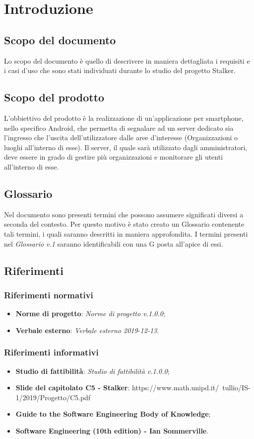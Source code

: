 \section{Introduzione}
\subsection{Scopo del documento}
Lo scopo del documento è quello di descrivere in maniera dettagliata i requisiti e i casi d'uso che sono stati individuati durante lo studio del progetto Stalker.
\subsection{Scopo del prodotto}
L'obbiettivo del prodotto è la realizzazione di un'applicazione per smartphone, nello specifico Android, che permetta di segnalare ad un server dedicato sia l'ingresso che l'uscita dell'utilizzatore dalle aree d'interesse (Organizzazioni o luoghi all'interno di esse).
Il server, il quale sarà utilizzato dagli amministratori, deve essere in grado di gestire più organizzazioni e monitorare gli utenti all'interno di esse.
\subsection{Glossario}
Nel documento sono presenti termini che possono assumere significati diversi a seconda del contesto. Per questo motivo è stato creato un Glossario contenente tali termini, i quali saranno descritti in maniera approfondita. I termini presenti nel \textit{Glossario v.1} saranno identificabili con una G posta all'apice di essi.

\subsection{Riferimenti}


\subsubsection{Riferimenti normativi}
\begin{itemize}
\item \textbf{Norme di progetto}: \textit{Norme di progetto v.1.0.0};
\item \textbf{Verbale esterno}: \textit{Verbale esterno 2019-12-13}.
\end{itemize}

\subsubsection{Riferimenti informativi}
\begin{itemize}
\item \textbf{Studio di fattibilità}: \textit{Studio di fattibilità v.1.0.0};
\item \textbf{Slide del capitolato C5 - Stalker}: https://www.math.unipd.it/~tullio/IS-1/2019/Progetto/C5.pdf
\item \textbf{Guide to the Software Engineering Body of Knowledge};
\item \textbf{Software Engineering (10th edition) - Ian Sommerville}.
\end{itemize}
